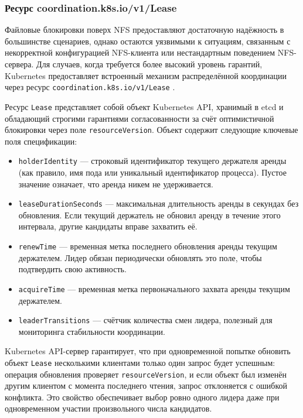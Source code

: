 \subsubsection{Ресурс coordination.k8s.io/v1/Lease}

Файловые блокировки поверх NFS предоставляют достаточную надёжность в большинстве сценариев, однако остаются уязвимыми к ситуациям, связанным с некорректной конфигурацией NFS-клиента или нестандартным поведением NFS-сервера. Для случаев, когда требуется более высокий уровень гарантий, Kubernetes предоставляет встроенный механизм распределённой координации через ресурс \texttt{coordination.k8s.io/v1/Lease} \cite{k8s_lease_api}.

Ресурс \texttt{Lease} представляет собой объект Kubernetes API, хранимый в etcd и обладающий строгими гарантиями согласованности за счёт оптимистичной блокировки через поле \texttt{resourceVersion}. Объект содержит следующие ключевые поля спецификации:
\begin{itemize}[leftmargin=*]
  \item \texttt{holderIdentity} --- строковый идентификатор текущего держателя аренды (как правило, имя пода или уникальный идентификатор процесса). Пустое значение означает, что аренда никем не удерживается.
  \item \texttt{leaseDurationSeconds} --- максимальная длительность аренды в секундах без обновления. Если текущий держатель не обновил аренду в течение этого интервала, другие кандидаты вправе захватить её.
  \item \texttt{renewTime} --- временная метка последнего обновления аренды текущим держателем. Лидер обязан периодически обновлять это поле, чтобы подтвердить свою активность.
  \item \texttt{acquireTime} --- временная метка первоначального захвата аренды текущим держателем.
  \item \texttt{leaderTransitions} --- счётчик количества смен лидера, полезный для мониторинга стабильности координации.
\end{itemize}

Kubernetes API-сервер гарантирует, что при одновременной попытке обновить объект \texttt{Lease} несколькими клиентами только один запрос будет успешным: операция обновления проверяет \texttt{resourceVersion}, и если объект был изменён другим клиентом с момента последнего чтения, запрос отклоняется с ошибкой конфликта. Это свойство обеспечивает выбор ровно одного лидера даже при одновременном участии произвольного числа кандидатов.

